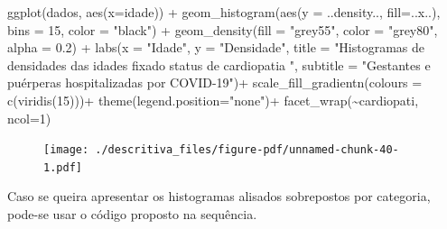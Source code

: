 \documentclass[
  letterpaper,
  DIV=11,
  numbers=noendperiod]{scrreprt}
\newenvironment{Shaded}{\begin{snugshade}}{\end{snugshade}}
\newcommand{\AttributeTok}[1]{\textcolor[rgb]{0.40,0.45,0.13}{#1}}
\newcommand{\DecValTok}[1]{\textcolor[rgb]{0.68,0.00,0.00}{#1}}
\newcommand{\FloatTok}[1]{\textcolor[rgb]{0.68,0.00,0.00}{#1}}
\newcommand{\FunctionTok}[1]{\textcolor[rgb]{0.28,0.35,0.67}{#1}}
\newcommand{\NormalTok}[1]{\textcolor[rgb]{0.00,0.23,0.31}{#1}}
\newcommand{\SpecialCharTok}[1]{\textcolor[rgb]{0.37,0.37,0.37}{#1}}
\newcommand{\StringTok}[1]{\textcolor[rgb]{0.13,0.47,0.30}{#1}}
\begin{document}
\begin{Shaded}
\begin{Highlighting}[]
\FunctionTok{ggplot}\NormalTok{(dados, }\FunctionTok{aes}\NormalTok{(}\AttributeTok{x=}\NormalTok{idade))  }\SpecialCharTok{+} 
  \FunctionTok{geom\_histogram}\NormalTok{(}\FunctionTok{aes}\NormalTok{(}\AttributeTok{y =}\NormalTok{ ..density.., }\AttributeTok{fill=}\NormalTok{..x..), }\AttributeTok{bins =} \DecValTok{15}\NormalTok{, }\AttributeTok{color =} \StringTok{"black"}\NormalTok{) }\SpecialCharTok{+}
  \FunctionTok{geom\_density}\NormalTok{(}\AttributeTok{fill =} \StringTok{"grey55"}\NormalTok{, }\AttributeTok{color =} \StringTok{"grey80"}\NormalTok{, }\AttributeTok{alpha =} \FloatTok{0.2}\NormalTok{) }\SpecialCharTok{+}
  \FunctionTok{labs}\NormalTok{(}\AttributeTok{x =} \StringTok{"Idade"}\NormalTok{, }\AttributeTok{y =} \StringTok{"Densidade"}\NormalTok{, }\AttributeTok{title =} \StringTok{"Histogramas de densidades das idades fixado status de cardiopatia "}\NormalTok{, }\AttributeTok{subtitle =} \StringTok{"Gestantes e puérperas hospitalizadas por COVID{-}19"}\NormalTok{)}\SpecialCharTok{+}
  \FunctionTok{scale\_fill\_gradientn}\NormalTok{(}\AttributeTok{colours =} \FunctionTok{c}\NormalTok{(}\FunctionTok{viridis}\NormalTok{(}\DecValTok{15}\NormalTok{)))}\SpecialCharTok{+}
  \FunctionTok{theme}\NormalTok{(}\AttributeTok{legend.position=}\StringTok{"none"}\NormalTok{)}\SpecialCharTok{+}
  \FunctionTok{facet\_wrap}\NormalTok{(}\SpecialCharTok{\textasciitilde{}}\NormalTok{cardiopati, }\AttributeTok{ncol=}\DecValTok{1}\NormalTok{)}
\end{Highlighting}
\end{Shaded}

\begin{figure}[H]

{\centering \texttt{[image: ./descritiva\_files/figure-pdf/unnamed-chunk-40-1.pdf]}

}

\end{figure}

Caso se queira apresentar os histogramas alisados sobrepostos por
categoria, pode-se usar o código proposto na sequência.
\end{document}
